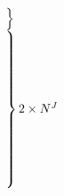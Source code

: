 \begin{equation}
\begin{array}{@{\kern-\nulldelimiterspace}l@{}}
 \left.\begin{array}{@{}c@{}}\\[0.3em]                              \end{array}\right\}     \\
 \left.\begin{array}{@{}c@{}}\\[0.3em] \\[0.3em] \\[0.3em] \\[0.5em] \\[0.3em] \\[0.3em] \\[0.3em] \\[0.8em] \end{array}\right\}2\times N^J\\
\end{array}
\end{equation}




